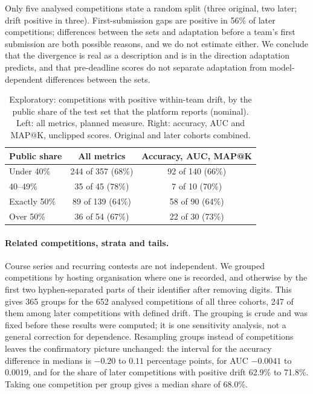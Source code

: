 \documentclass[10pt]{article}
\begin{document}
Only five analysed competitions state a random split (three original, two later; drift positive in three). First-submission gaps are positive in 56\% of later competitions; differences between the sets and adaptation before a team's first submission are both possible reasons, and we do not estimate either. We conclude that the divergence is real as a description and is in the direction adaptation predicts, and that pre-deadline scores do not separate adaptation from model-dependent differences between the sets.

\begin{table}[t]
\caption{Exploratory: competitions with positive within-team drift, by the public share of the test set that the platform reports (nominal). Left: all metrics, planned measure. Right: accuracy, AUC and MAP@K, unclipped scores. Original and later cohorts combined.}
\label{tab:share}
\centering\small
\begin{tabular}{lcc}
\toprule
Public share & All metrics & Accuracy, AUC, MAP@K \\
\midrule
Under 40\% & 244 of 357 (68\%) & 92 of 140 (66\%) \\
40--49\% & 35 of 45 (78\%) & 7 of 10 (70\%) \\
Exactly 50\% & 89 of 139 (64\%) & 58 of 90 (64\%) \\
Over 50\% & 36 of 54 (67\%) & 22 of 30 (73\%) \\
\bottomrule
\end{tabular}
\end{table}

\paragraph{Related competitions, strata and tails.} Course series and recurring contests are not independent. We grouped competitions by hosting organisation where one is recorded, and otherwise by the first two hyphen-separated parts of their identifier after removing digits. This gives 365 groups for the 652 analysed competitions of all three cohorts, 247 of them among later competitions with defined drift. The grouping is crude and was fixed before these results were computed; it is one sensitivity analysis, not a general correction for dependence. Resampling groups instead of competitions leaves the confirmatory picture unchanged: the interval for the accuracy difference in medians is $-0.20$ to $0.11$ percentage points, for AUC $-0.0041$ to $0.0019$, and for the share of later competitions with positive drift 62.9\% to 71.8\%. Taking one competition per group gives a median share of 68.0\%.
\end{document}
